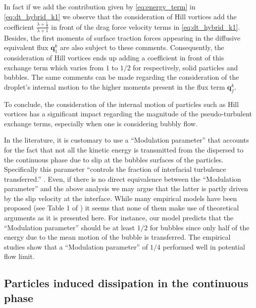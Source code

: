 In fact if we add the contribution given by \ref{eq:energy_term} in \ref{eq:dt_hybrid_k1} we observe that the consideration of Hill vortices add the coefficient $\frac{\lambda +\frac{1}{2}}{\lambda+1}$ in front of the drag force velocity terms in \ref{eq:dt_hybrid_k1}.
Besides, the first moments of surface traction forces appearing in the diffusive equivalent flux $\textbf{q}_1^k$ are also subject to these comments. 
Consequently, the consideration of Hill vortices ends up adding a coefficient in front of this exchange term which varies from $1$ to $1/2$ for respectively, solid particles and bubbles. 
The same comments can be made regarding the consideration of the droplet's internal motion to the higher moments present in the flux term $\textbf{q}^k_f$. 

To conclude, the consideration of the internal motion of particles such as Hill vortices has a significant impact regarding the magnitude of the pseudo-turbulent exchange terms, especially when one is considering bubbly flow. 

In the literature\citep{magolan2019quantitative}, it is customary to use a ``Modulation parameter'' that accounts for the fact that not all the kinetic energy is transmitted from the dispersed to the continuous phase due to slip at the bubbles surfaces of the particles.
Specifically this parameter ``controls the fraction of interfacial turbulence transferred.'' \citep{magolan2019quantitative}. 
Even, if there is no direct equivalence between the ``Modulation parameter'' and the above analysis we may argue that the latter is partly driven by the slip velocity at the interface. 
While many empirical models have been proposed (see Table 1 of \citet{magolan2019quantitative}) it seems that none of them make use of theoretical arguments as it is presented here.
For instance, our model predicts that the ``Modulation parameter'' should be at least $1/2$ for bubbles since only half of the energy due to the mean motion of the bubble is transferred. 
The empirical studies show that a ``Modulation parameter'' of $1/4$ performed well \citet{colombo2015multiphase} in potential flow limit. 



\subsection{Particles induced dissipation in the continuous phase}

